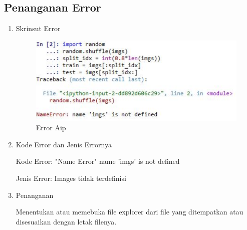 \begin{enumerate}
\subsection{Penanganan Error}
\begin{enumerate}

\item Skrinsut Error
\begin{figure}[ht]
\centering
\includegraphics[scale=0.7]{figures/AIP/erorchapter7.PNG}
\caption{ Error Aip}
\label{eror}
\end{figure}
\item Kode Error dan Jenis Errornya
\par Kode Error: "Name Error" name 'imgs'  is not defined
\par Jenis Error: Images tidak terdefinisi
\item Penanganan
\par Menentukan atau memebuka file explorer dari file yang ditempatkan atau disesuaikan dengan letak filenya.

\end{enumerate}
\end{enumerate}